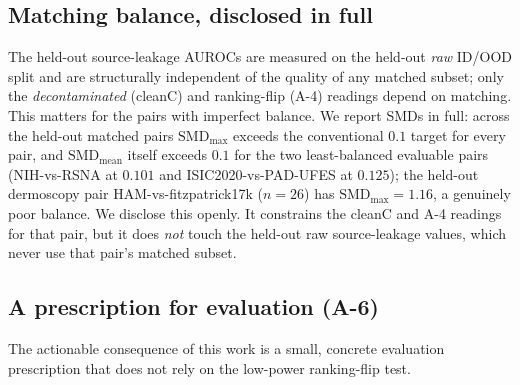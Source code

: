 \documentclass{article}
\begin{document}
\subsection{Matching balance, disclosed in full}

The held-out source-leakage AUROCs are measured on the held-out \emph{raw}
ID/OOD split and are structurally independent of the quality of any matched
subset; only the \emph{decontaminated} (cleanC) and ranking-flip (A-4) readings
depend on matching. This matters for the pairs with imperfect balance. We report
SMDs in full: across the held-out matched pairs $\text{SMD}_\text{max}$ exceeds
the conventional $0.1$ target for every pair, and $\text{SMD}_\text{mean}$ itself
exceeds $0.1$ for the two least-balanced evaluable pairs (NIH-vs-RSNA at $0.101$
and ISIC2020-vs-PAD-UFES at $0.125$); the held-out dermoscopy pair
HAM-vs-fitzpatrick17k ($n=26$) has $\text{SMD}_\text{max} = 1.16$, a genuinely
poor balance. We disclose this
openly. It constrains the cleanC and A-4 readings for that pair, but it does
\emph{not} touch the held-out raw source-leakage values, which never use that
pair's matched subset.

\subsection{A prescription for evaluation (A-6)}

The actionable consequence of this work is a small, concrete evaluation
prescription that does not rely on the low-power ranking-flip test.
\end{document}

